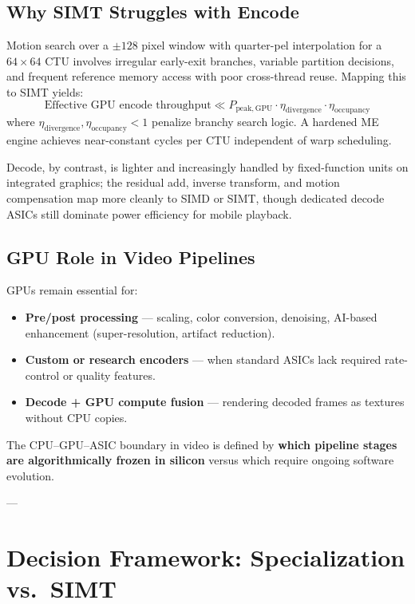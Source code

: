 \documentclass[11pt,journal,onecolumn]{IEEEtran}
\begin{document}
\subsection{Why SIMT Struggles with Encode}
Motion search over a $\pm 128$ pixel window with quarter-pel interpolation for a $64 \times 64$ CTU involves irregular early-exit branches, variable partition decisions, and frequent reference memory access with poor cross-thread reuse. Mapping this to SIMT yields:
\begin{equation}
\text{Effective GPU encode throughput} \ll P_{\mathrm{peak,GPU}} \cdot \eta_{\mathrm{divergence}} \cdot \eta_{\mathrm{occupancy}}
\end{equation}
where $\eta_{\mathrm{divergence}}, \eta_{\mathrm{occupancy}} < 1$ penalize branchy search logic. A hardened ME engine achieves near-constant cycles per CTU independent of warp scheduling.

Decode, by contrast, is lighter and increasingly handled by fixed-function units on integrated graphics; the residual add, inverse transform, and motion compensation map more cleanly to SIMD or SIMT, though dedicated decode ASICs still dominate power efficiency for mobile playback.

\subsection{GPU Role in Video Pipelines}
GPUs remain essential for:
\begin{itemize}
    \item \textbf{Pre/post processing} --- scaling, color conversion, denoising, AI-based enhancement (super-resolution, artifact reduction).
    \item \textbf{Custom or research encoders} --- when standard ASICs lack required rate-control or quality features.
    \item \textbf{Decode + GPU compute fusion} --- rendering decoded frames as textures without CPU copies.
\end{itemize}
The CPU--GPU--ASIC boundary in video is defined by \textbf{which pipeline stages are algorithmically frozen in silicon} versus which require ongoing software evolution.

---

\section{Decision Framework: Specialization vs.\ SIMT}
\end{document}

